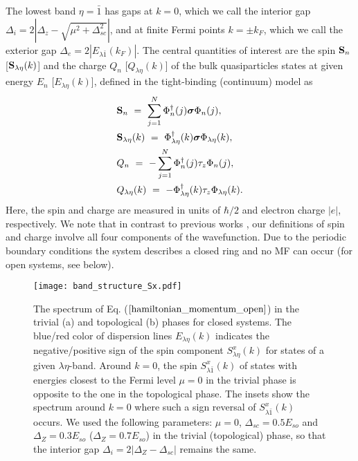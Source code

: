 \documentclass[prl,twocolumn,showpacs,floatfix,amsbsy,amsbsy,superscriptaddress]{revtex4-1}
\begin{document}
The lowest band $\eta=\bar 1$ has gaps at $k=0$, which we call the interior gap $\Delta_i=2|\Delta_z-\sqrt{\mu^2+\Delta_{sc}^2}|$, and at finite Fermi points $k=\pm k_F$, which we call the exterior gap $\Delta_e=2|E_{\lambda\bar 1}(k_F)|$.
The central quantities of interest are the
spin ${\bf S}_{n}$ [${\bf S}_{\lambda\eta}(k)$] and the charge $Q_n$ [$Q_{\lambda\eta}(k)$] of  the bulk quasiparticles states at given energy $E_n$ [$E_{\lambda\eta}(k)$],
defined in the tight-binding (continuum) model as 
\begin{align}
&{\bf S}_{n}~=~\sum_{j=1}^N\Phi_n^\dag(j){\boldsymbol\sigma}\Phi_n(j), \label{spin_formula}\\
&{\bf S}_{\lambda\eta}(k)~=~\Phi_{\lambda\eta}^\dag(k){\boldsymbol\sigma}\Phi_{\lambda\eta}(k),\label{spin_formula_k}\\
&Q_n~=~-\sum_{j=1}^N\Phi_n^\dag(j)\tau_z\Phi_n(j),\label{charge_formula} \\
&Q_{\lambda\eta}(k)~=~-\Phi_{\lambda\eta}^\dag(k)\tau_z\Phi_{\lambda\eta}(k).\label{charge_formula_k}
\end{align}
Here, the spin and charge are  measured in units of $\hbar/2$ and electron charge $|e|$, respectively.  We note that in contrast to previous works \cite{Annica,Bena}, our definitions of spin and charge involve all four components of the wavefunction.
Due to the periodic boundary conditions the system describes a closed ring and no MF can occur (for open systems, see below).

\begin{figure}[t]
\centering
\texttt{[image: band\_structure\_Sx.pdf]}
\caption{The spectrum of Eq.  ($\ref{hamiltonian_momentum_open}$)  in the trivial (a) and topological (b) phases for closed systems. The blue/red color of dispersion lines $E_{\lambda\eta} (k)$ indicates the negative/positive sign of the spin component  $S^x_{\lambda\eta}(k)$  
for states of a given $\lambda\eta$-band. 
Around $k=0$, the spin   $S^x_{\lambda\bar1}(k)$ of  states with energies closest to the Fermi level $\mu=0$ in the trivial phase is opposite to the one in the topological phase. The insets show the spectrum around $k=0$ where such a  sign reversal of $S^x_{\lambda\bar1}(k)$ 
occurs. We used the following parameters: $\mu=0$, $\Delta_{sc}=0.5E_{so}$ and $\Delta_{Z}=0.3E_{so} $ ($\Delta_{Z}=0.7E_{so}$) in the trivial (topological) phase, so that the interior gap $\Delta_i=2|\Delta_{Z}-\Delta_{sc}|$ remains the same.}
\label{fig:band_structure_Sx}
\end{figure}
\end{document}
